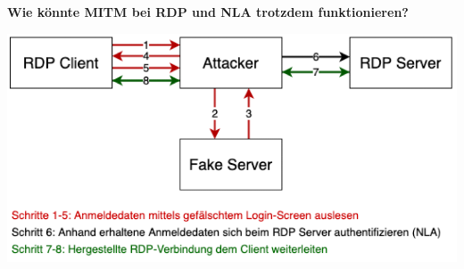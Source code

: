 \textbf{Wie könnte MITM bei RDP und NLA trotzdem funktionieren?}
\begin{center}
    \vspace{-8pt}
    \includegraphics[width=1.0\linewidth]{./img/09-mitm/rdp_works}
    \vspace{-8pt}
\end{center}
